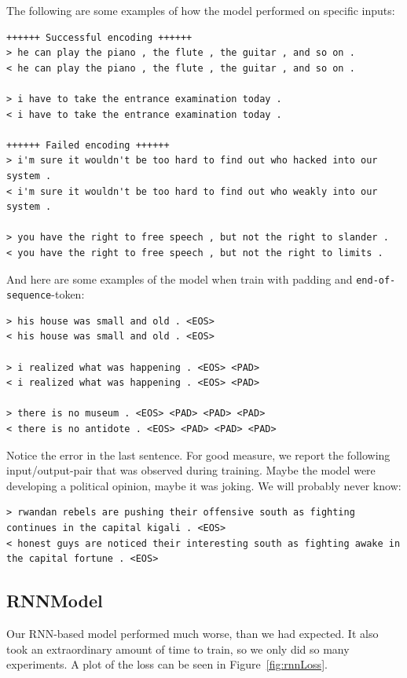 \documentclass{article}
\begin{document}
The following are some examples of how the model performed on specific inputs:

\begin{verbatim}
++++++ Successful encoding ++++++
> he can play the piano , the flute , the guitar , and so on .
< he can play the piano , the flute , the guitar , and so on .

> i have to take the entrance examination today .
< i have to take the entrance examination today .

++++++ Failed encoding ++++++
> i'm sure it wouldn't be too hard to find out who hacked into our system .
< i'm sure it wouldn't be too hard to find out who weakly into our system .

> you have the right to free speech , but not the right to slander .
< you have the right to free speech , but not the right to limits .
\end{verbatim}

And here are some examples of the model when train with padding and
\texttt{end-of-sequence}-token:

\begin{verbatim}
> his house was small and old . <EOS>
< his house was small and old . <EOS>

> i realized what was happening . <EOS> <PAD>
< i realized what was happening . <EOS> <PAD>

> there is no museum . <EOS> <PAD> <PAD> <PAD>
< there is no antidote . <EOS> <PAD> <PAD> <PAD>
\end{verbatim}

Notice the error in the last sentence. For good measure, we report the following
input/output-pair that was observed during training. Maybe the model were
developing a political opinion, maybe it was joking. We will probably never
know:

\begin{verbatim}
> rwandan rebels are pushing their offensive south as fighting continues in the capital kigali . <EOS>
< honest guys are noticed their interesting south as fighting awake in the capital fortune . <EOS>
\end{verbatim}

\subsection{RNNModel}

Our RNN-based model performed much worse, than we had expected. It also took an
extraordinary amount of time to train, so we only did so many experiments. A
plot of the loss can be seen in Figure~\ref{fig:rnnLoss}. 
\end{document}
